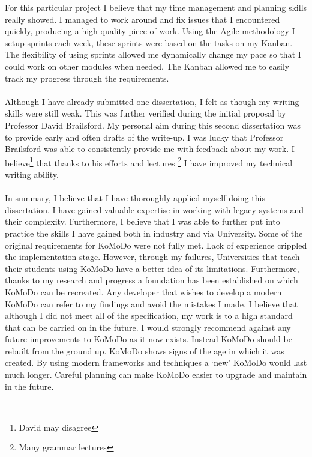%
For this particular project I believe that my time management and planning skills really showed. I managed to work around and fix issues that I encountered quickly, producing a high quality piece of work. Using the Agile methodology I setup sprints each week, these sprints were based on the tasks on my Kanban. The flexibility of using sprints allowed me dynamically change my pace so that I could work on other modules when needed. The Kanban allowed me to easily track my progress through the requirements.\\\\
%
Although I have already submitted one dissertation, I felt as though my writing skills were still weak. This was further verified during the initial proposal by Professor David Brailsford. My personal aim during this second dissertation was to provide early and often drafts of the write-up. I was lucky that Professor Brailsford was able to consistently provide me with feedback about my work. I believe\footnote{David may disagree} that thanks to his efforts and lectures \footnote{Many grammar lectures} I have improved my technical writing ability.\\\\
%
In summary, I believe that I have thoroughly applied myself doing this dissertation. I have gained valuable expertise in working with legacy systems and their complexity. Furthermore, I believe that I was able to further put into practice the skills I have gained both in industry and via University.
%
%
%
Some of the original requirements for KoMoDo were not fully met. Lack of experience crippled the implementation stage. However, through my failures, Universities that teach their students using KoMoDo have a better idea of its limitations. Furthermore, thanks to my research and progress a foundation has been established on which KoMoDo can be recreated. Any developer that wishes to develop a modern KoMoDo can refer to my findings and avoid the mistakes I made. I believe that although I did not meet all of the specification, my work is to a high standard that can be carried on in the future.
%
%
%
I would strongly recommend against any future improvements to KoMoDo as it now exists. Instead KoMoDo should be rebuilt from the ground up. KoMoDo shows signs of the age in which it was created. By using modern frameworks and techniques a `new' KoMoDo would last much longer. Careful planning can make KoMoDo easier to upgrade and maintain in the future.\\\\
